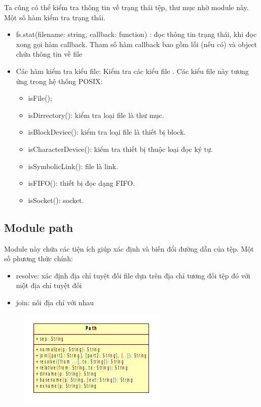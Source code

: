		Ta cũng có thể kiểm tra thông tin về trạng thái tệp, thư mục nhờ module này. Một số hàm kiểm tra trạng thái. 
		\begin{itemize}
			\item fs.stat(filename: string, callback: function) : đọc thông tin trạng thái, khi đọc xong gọi hàm callback. Tham số hàm callback bao gồm lỗi (nếu có) và object chứa thông tin về file
			\item Các hàm kiểm tra kiểu file: Kiểm tra các kiểu file . Các kiểu file này tương ứng trong hệ thống POSIX:
			\begin{itemize}
				\item isFile();
				\item isDirrectory(): kiểm tra loại file là thư mục.
				\item isBlockDevice(): kiểm tra loại file là thiết bị block.
				\item isCharacterDevice(): kiểm tra thiết bị thuộc loại đọc ký tự.
				\item isSymbolicLink(): file là link.
				\item isFIFO(): thiết bị đọc dạng FIFO.
				\item isSocket(): socket.
			\end{itemize}
			
		\end{itemize}

	\subsection{Module path}

		Module này chứa các tiện ích giúp xác định và biến đổi đường dẫn của tệp. Một số phương thức chính:
		\begin{itemize}
			\item resolve: xác định địa chỉ tuyệt đối file dựa trên địa chỉ tương đối tệp đó với một địa chỉ tuyệt đối
			\item join: nối địa chỉ với nhau
		\end{itemize}
		
		\begin{figure}[-h]
			\centering
			\includegraphics[scale=0.7]{3_3_0}
		\end{figure}

